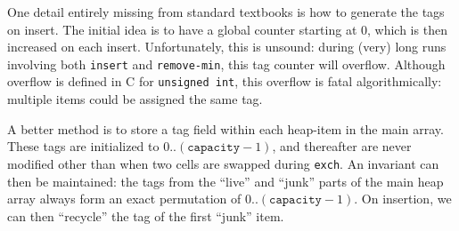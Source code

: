 One detail entirely missing from standard textbooks is how to generate the tags on insert.  The initial idea is to have a global counter starting at 0, which is then increased on each insert.  Unfortunately, this is unsound: during (very) long runs involving both \texttt{insert} and \texttt{remove-min}, this tag counter will overflow.  Although overflow is defined in C for \texttt{unsigned int}, this overflow is fatal algorithmically: multiple items could be assigned the same tag.

A better method is to store a tag field within each heap-item in the main array.  These tags are initialized to $0..(\texttt{capacity}-1)$, and thereafter are never modified other than when two cells are swapped during \texttt{exch}.  An invariant can then be maintained: the tags from the ``live'' and ``junk'' parts of the main heap array always form an exact permutation of $0..(\texttt{capacity}-1)$.  On insertion, we can then ``recycle'' the tag of the first ``junk'' item.


